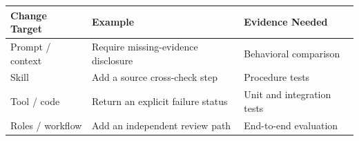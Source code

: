 \begin{tabular}{@{}P{3.3cm}P{5.3cm}P{3.9cm}@{}}
\toprule
\textbf{Change Target} & \textbf{Example} & \textbf{Evidence Needed} \\
\midrule
Prompt / context & Require missing-evidence disclosure & Behavioral comparison \\
Skill & Add a source cross-check step & Procedure tests \\
Tool / code & Return an explicit failure status & Unit and integration tests \\
Roles / workflow & Add an independent review path & End-to-end evaluation \\
\bottomrule
\end{tabular}

